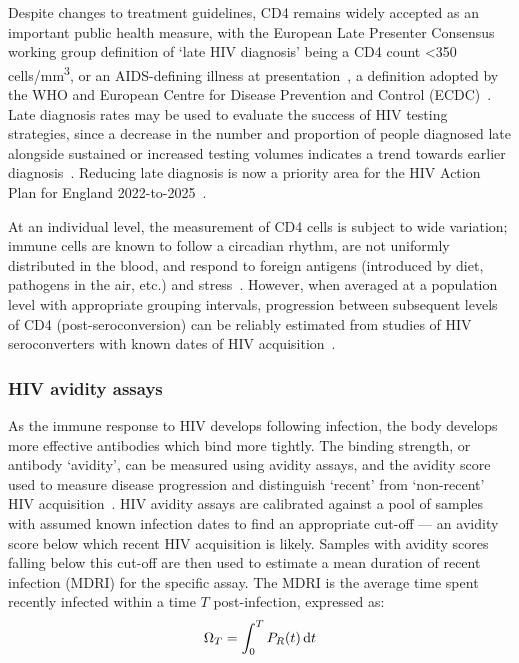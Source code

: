 Despite changes to treatment guidelines, CD4 remains widely accepted as an important public health measure, with the European Late Presenter Consensus working group definition of `late HIV diagnosis' being a CD4 count <350 cells/mm\textsuperscript{3}, or an AIDS-defining illness at presentation~\parencite{Antinori2011-hg}, a definition adopted by the WHO and European Centre for Disease Prevention and Control (ECDC)~\parencite{World_Health_Organisation2010-fk, European_Centre_for_Disease_Prevention_and_Control2020-db}. Late diagnosis rates may be used to evaluate the success of HIV testing strategies, since a decrease in the number and proportion of people diagnosed late alongside sustained or increased testing volumes indicates a trend towards earlier diagnosis~\parencite{Delpech2013-ug}. Reducing late diagnosis is now a priority area for the HIV Action Plan for England 2022-to-2025~\parencite{Department-of-Health-and-Social-Care2021-ee}.

At an individual level, the measurement of CD4 cells is subject to wide variation; immune cells are known to follow a circadian rhythm, are not uniformly distributed in the blood, and respond to foreign antigens (introduced by diet, pathogens in the air, etc.) and stress~\parencite{Keshani2023-ax, Moncivaiz2013-vz}. However, when averaged at a population level with appropriate grouping intervals, progression between subsequent levels of CD4 (post-seroconversion) can be reliably estimated from studies of HIV seroconverters with known dates of HIV acquisition~\parencite{CASCADE_Concerted_Action_on_SeroConversion_to_AIDS_and_Death_in_Europe_Collaboration2000-wd}.

\subsubsection{HIV avidity assays}

As the immune response to HIV develops following infection, the body develops more effective antibodies which bind more tightly. The binding strength, or antibody `avidity', can be measured using avidity assays, and the avidity score used to measure disease progression and distinguish `recent' from `non-recent' HIV acquisition~\parencite{Murphy2008-zu,SEDIA_Biosciences_Corporation2021-hb}. HIV avidity assays are calibrated against a pool of samples with assumed known infection dates to find an appropriate cut-off --- an avidity score below which recent HIV acquisition is likely. Samples with avidity scores falling below this cut-off are then used to estimate a mean duration of recent infection (MDRI) for the specific assay. The MDRI is the average time spent recently infected within a time $T$ post-infection, expressed as:
%
\[
  \Omega_T = \int_0^T{P_R(t) \mathop{}\!\mathrm{d} t}
\]

